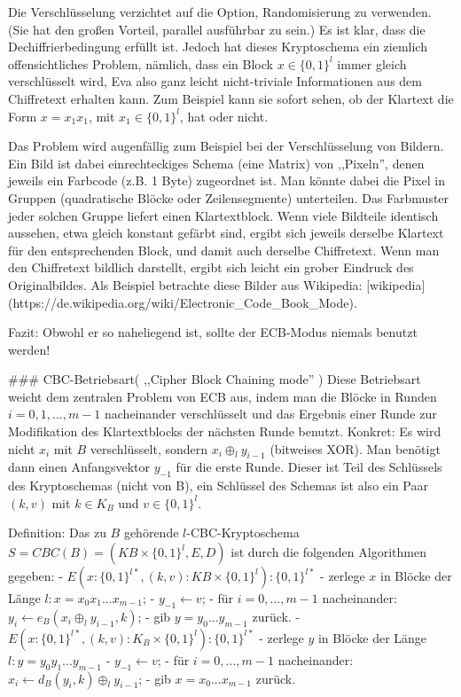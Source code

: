 \documentclass[a4paper]{article}
\begin{document}
\begin{multicols}{3}
        Die Verschlüsselung verzichtet auf die Option, Randomisierung zu verwenden. (Sie hat den großen Vorteil, parallel ausführbar zu sein.) Es ist klar, dass die Dechiffrierbedingung erfüllt ist. Jedoch hat dieses Kryptoschema ein ziemlich offensichtliches Problem, nämlich,
        dass ein Block $x\in\{0,1\}^l$ immer gleich verschlüsselt wird, Eva also ganz leicht nicht-triviale Informationen aus dem Chiffretext erhalten kann. Zum Beispiel kann sie sofort sehen, ob der Klartext die Form $x=x_1 x_1$, mit $x_1\in\{0,1\}^l$, hat oder nicht.

        Das Problem wird augenfällig zum Beispiel bei der Verschlüsselung von Bildern. Ein Bild ist dabei einrechteckiges Schema (eine Matrix) von ,,Pixeln'', denen jeweils ein Farbcode (z.B. 1 Byte) zugeordnet ist. Man könnte dabei die Pixel in Gruppen (quadratische Blöcke oder Zeilensegmente) unterteilen. Das Farbmuster jeder solchen Gruppe liefert einen Klartextblock. Wenn viele Bildteile identisch aussehen, etwa gleich konstant gefärbt sind, ergibt sich jeweils derselbe Klartext für den entsprechenden Block, und damit auch derselbe Chiffretext. Wenn man den Chiffretext bildlich darstellt, ergibt sich leicht ein grober Eindruck des Originalbildes. Als Beispiel betrachte diese Bilder aus Wikipedia: [wikipedia](https://de.wikipedia.org/wiki/Electronic_Code_Book_Mode).

        Fazit: Obwohl er so naheliegend ist, sollte der ECB-Modus niemals benutzt werden!

        ### CBC-Betriebsart( ,,Cipher Block Chaining mode'' )
        Diese Betriebsart weicht dem zentralen Problem von ECB aus, indem man die Blöcke in Runden $i=0, 1 ,...,m-1$ nacheinander verschlüsselt und das Ergebnis einer Runde zur Modifikation des Klartextblocks der nächsten Runde benutzt. Konkret: Es wird nicht $x_i$ mit $B$ verschlüsselt, sondern $x_i\oplus_l y_{i-1}$ (bitweises XOR). Man benötigt dann einen Anfangsvektor $y_{-1}$ für die erste Runde. Dieser ist Teil des Schlüssels des Kryptoschemas (nicht von B), ein Schlüssel des Schemas ist also ein Paar $(k,v)$ mit $k\in K_B$ und $v\in\{0,1\}^l$.

        Definition: Das zu $B$ gehörende $l$-CBC-Kryptoschema $S=CBC(B)=(KB\times\{0,1\}^l,E,D)$ ist durch die folgenden Algorithmen gegeben:
        - $E(x:\{0,1\}^{l*},(k,v) :KB\times\{0,1\}^l) :\{0,1\}^{l*}$
        - zerlege $x$ in Blöcke der Länge $l:x=x_0 x_1 ...x_{m-1}$;
        - $y_{-1} \leftarrow v$;
        - für $i= 0,...,m-1$ nacheinander: $y_i\leftarrow e_B(x_i\oplus_l y_{i-1},k)$;
        - gib $y=y_0 ...y_{m-1}$ zurück.
        - $E(x:\{0,1\}^{l*},(k,v) :K_B\times\{0,1\}^l) :\{0,1\}^{l*}$
        - zerlege $y$ in Blöcke der Länge $l:y=y_0 y_1 ...y_{m-1}$
        - $y_{-1} \leftarrow v$;
        - für $i=0,...,m-1$ nacheinander: $x_i\leftarrow d_B(y_i,k)\oplus_l y_{i-1}$;
        - gib $x=x_0 ...x_{m-1}$ zurück.


\end{multicols}
\end{document}
